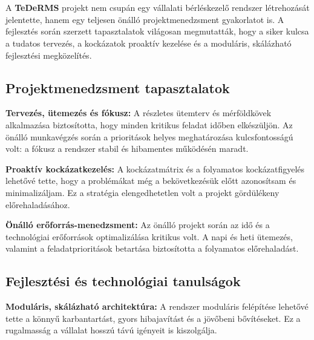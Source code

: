 \chapter{\lessons}

A \textbf{TeDeRMS} projekt nem csupán egy vállalati bérléskezelő rendszer létrehozását jelentette, 
hanem egy teljesen önálló projektmenedzsment gyakorlatot is. 
A fejlesztés során szerzett tapasztalatok világosan megmutatták, hogy a siker kulcsa a tudatos tervezés, 
a kockázatok proaktív kezelése és a moduláris, skálázható fejlesztési megközelítés.

\section{Projektmenedzsment tapasztalatok}

\textbf{Tervezés, ütemezés és fókusz:}  
A részletes ütemterv és mérföldkövek alkalmazása biztosította, hogy minden kritikus feladat időben elkészüljön.  
Az önálló munkavégzés során a prioritások helyes meghatározása kulcsfontosságú volt: 
a fókusz a rendszer stabil és hibamentes működésén maradt.

\textbf{Proaktív kockázatkezelés:}  
A kockázatmátrix és a folyamatos kockázatfigyelés lehetővé tette, hogy a problémákat még a bekövetkezésük előtt azonosítsam és minimalizáljam.  
Ez a stratégia elengedhetetlen volt a projekt gördülékeny előrehaladásához.

\textbf{Önálló erőforrás-menedzsment:}  
Az önálló projekt során az idő és a technológiai erőforrások optimalizálása kritikus volt.  
A napi és heti ütemezés, valamint a feladatprioritások betartása biztosította a folyamatos előrehaladást.

\section{Fejlesztési és technológiai tanulságok}

\textbf{Moduláris, skálázható architektúra:}  
A rendszer moduláris felépítése lehetővé tette a könnyű karbantartást, gyors hibajavítást és a jövőbeni bővítéseket.  
Ez a rugalmasság a vállalat hosszú távú igényeit is kiszolgálja.

